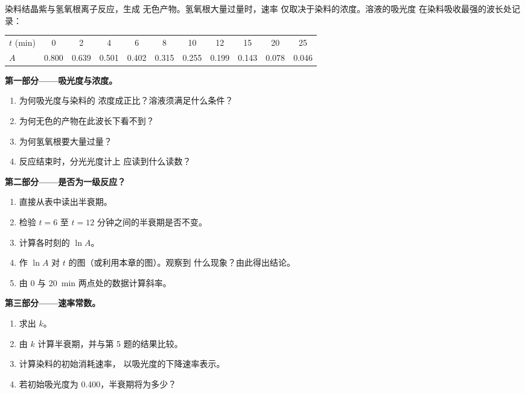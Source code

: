 \begin{problem}
\label{pb:g12:reaction-rates:1}
染料结晶紫与氢氧根离子反应，生成
无色产物。氢氧根大量过量时，速率
仅取决于染料的浓度。溶液的吸光度
在染料吸收最强的波长处记录：
\begin{center}
\small
\begin{tabular}{l*{10}{c}}
\hline
$t$ (\si{min}) & 0 & 2 & 4 & 6 & 8 & 10 & 12 & 15 & 20 & 25 \\
$A$ & 0.800 & 0.639 & 0.501 & 0.402 & 0.315 & 0.255 & 0.199 & 0.143 &
0.078 & 0.046 \\
\hline
\end{tabular}
\end{center}

\medskip
\noindent\textbf{第一部分——吸光度与浓度。}
\begin{enumerate}
  \item 为何吸光度与染料的
        浓度成正比？溶液须满足什么条件？
  \item 为何无色的产物在此波长下看不到？
  \item 为何氢氧根要大量过量？
  \item 反应结束时，分光光度计上
        应读到什么读数？
\end{enumerate}

\medskip
\noindent\textbf{第二部分——是否为一级反应？}
\begin{enumerate}[resume]
  \item 直接从表中读出半衰期。
  \item 检验 $t = 6$ 至 $t = 12$ 分钟之间的半衰期是否不变。
  \item 计算各时刻的 $\ln A$。
  \item 作 $\ln A$ 对 $t$ 的图（或利用本章的图）。观察到
        什么现象？由此得出结论。
  \item 由 0 与 \qty{20}{min} 两点处的数据计算斜率。
\end{enumerate}

\medskip
\noindent\textbf{第三部分——速率常数。}
\begin{enumerate}[resume]
  \item 求出 $k$。
  \item 由 $k$ 计算半衰期，并与第 5 题的结果比较。
  \item 计算染料的初始消耗速率，
        以吸光度的下降速率表示。
  \item 若初始吸光度为 0.400，半衰期将为多少？
\end{enumerate}


\end{problem}
